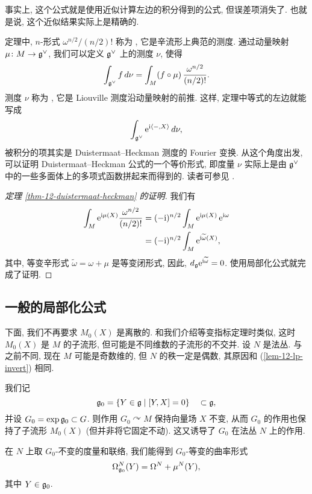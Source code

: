 事实上, 这个公式就是使用近似计算左边的积分得到的公式,
但误差项消失了. 也就是说, 这个近似结果实际上是精确的.

定理中, $n$-形式 $\omega^{n/2} / (n/2)!$ 称为 ,
它是辛流形上典范的测度. 通过动量映射 $\mu \colon M \to \mathfrak{g}^\vee$,
我们可以定义 $\mathfrak{g}^\vee$ 上的测度 $\nu$, 使得
\[ \int_{\mathfrak{g}^\vee} f \, d \nu =
    \int_M (f \circ \mu) \, \frac{\omega^{n/2}}{(n/2)!}. \]
测度 $\nu$ 称为 ,
它是 Liouville 测度沿动量映射的前推. 这样, 定理中等式的左边就能写成
\[ \int_{\mathfrak{g}^\vee} \mathrm{e}^{\mathrm{i} \langle -, X \rangle} \, d \nu, \]
被积分的项其实是 Duistermaat--Heckman 测度的 Fourier 变换.
从这个角度出发, 可以证明 Duistermaat--Heckman 公式的一个等价形式,
即度量 $\nu$ 实际上是由 $\mathfrak{g}^\vee$ 中的一些多面体上的多项式函数拼起来而得到的.
读者可参见 \cite{atiyah-bott}.

\begin{proof} [定理 \ref{thm-12-duistermaat-heckman} 的证明]
    我们有
    \begin{align*}
        \int_M \mathrm{e}^{\mathrm{i} \mu (X)} \frac{\omega^{n/2}}{(n/2)!}
        &= (-\mathrm{i})^{n/2} \int_M \mathrm{e}^{\mathrm{i} \mu (X)} \, \mathrm{e}^{\mathrm{i} \omega} \\
        &= (-\mathrm{i})^{n/2} \int_M \mathrm{e}^{\mathrm{i} \widetilde{\omega} (X)},
    \end{align*}
    其中, 等变辛形式 $\widetilde{\omega} = \omega + \mu$ 是等变闭形式,
    因此, $d_{\mathfrak{g}} \mathrm{e}^{\mathrm{i} \widetilde{\omega}} = 0$.
    使用局部化公式就完成了证明.
\end{proof}


\subsection{一般的局部化公式}

下面, 我们不再要求 $M_0 (X)$ 是离散的.
和我们介绍等变指标定理时类似, 这时 $M_0 (X)$ 是 $M$ 的子流形,
但可能是不同维数的子流形的不交并. 设 $N$ 是法丛.
与之前不同, 现在 $M$ 可能是奇数维的, 但 $N$ 的秩一定是偶数,
其原因和 (\ref{lem-12-lp-invert}) 相同.

我们记
\[ \mathfrak{g}_0 = \{ Y \in \mathfrak{g} \mid [Y, X] = 0 \} \quad \subset \mathfrak{g}, \]
并设 $G_0 = \exp \mathfrak{g}_0 \subset G$.
则作用 $G_0 \curvearrowright M$ 保持向量场 $X$ 不变, 从而
$G_0$ 的作用也保持了子流形 $M_0 (X)$ (但并非将它固定不动).
这又诱导了 $G_0$ 在法丛 $N$ 上的作用.

在 $N$ 上取 $G_0$-不变的度量和联络, 我们能得到 $G_0$-等变的曲率形式
\[ \Omega_{\mathfrak{g}_0}^N (Y) = \Omega^N + \mu^N (Y), \]
其中 $Y \in \mathfrak{g}_0$.


